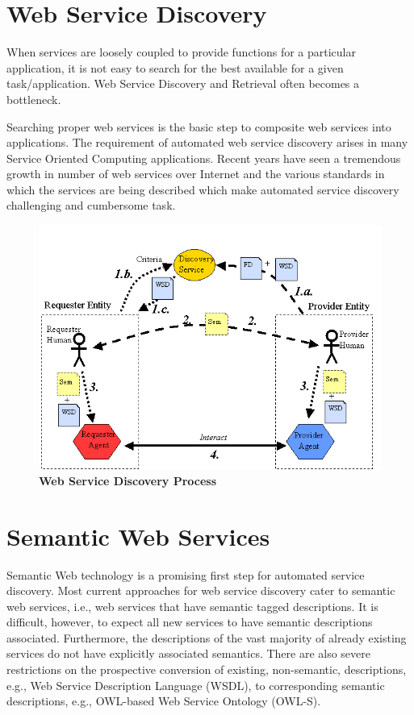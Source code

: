 \documentclass[12pt, oneside]{book}
\begin{document}
\section{Web Service Discovery}
When services are loosely coupled to provide functions for a particular application, it is not easy to search for the best available for a given task/application. Web Service Discovery and Retrieval often becomes a bottleneck. \\ \par
Searching proper web services is the basic step to composite web services into applications. The requirement of automated web service discovery arises in many Service Oriented Computing applications. Recent years have seen a tremendous growth in number of web services over Internet and the various standards in which the services are being described which make automated service discovery challenging and cumbersome task. \\ \par
\begin{figure}[H]
 \centering
 \includegraphics[width=\textwidth]{pics/discovery_process.png}
 \caption{\textbf{Web Service Discovery Process}}
\end{figure}

\section{Semantic Web Services}
Semantic Web technology is a promising first step for automated service discovery. Most current approaches for web service discovery cater to semantic web services, i.e., web services that have semantic tagged descriptions. It is difficult, however, to expect all new services to have semantic descriptions associated. Furthermore, the descriptions of the vast majority of already existing services do not have explicitly associated semantics. There are also severe restrictions on the prospective conversion of existing, non-semantic, descriptions, e.g., Web Service Description Language (WSDL), to corresponding semantic descriptions, e.g., OWL-based Web Service Ontology (OWL-S). \\ \par
\end{document}
